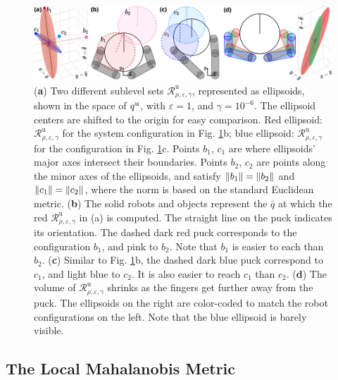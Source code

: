 \begin{figure}
\centering\includegraphics[width=1.0\textwidth]{figures/03_contact_rich_planning/reachability_planar_hand5.png}
\caption{(\textbf{a}) Two different sublevel sets $\mathcal{R}^\mathrm{u}_{\rho, \varepsilon, \gamma}$, represented as ellipsoids, shown in the space of ${q^\mathrm{u}}$, with $\varepsilon = 1$, and $\gamma = 10^{-6}$. The ellipsoid centers are shifted to the origin for easy comparison. Red ellipsoid: $\mathcal{R}^\mathrm{u}_{\rho, \varepsilon, \gamma}$ for the system configuration in Fig. \ref{fig:reachability_planar_hand}b; blue ellipsoid: $\mathcal{R}^\mathrm{u}_{\rho, \varepsilon, \gamma}$ for the configuration in Fig. \ref{fig:reachability_planar_hand}c. Points $b_1$, $c_1$ are where ellipsoids' major axes intersect their boundaries. Points $b_2$, $c_2$ are points along the minor axes of the ellipsoids, and satisfy $\left\lVert{b_1}\right\rVert = \left\lVert{b_2}\right\rVert$ and $\left\lVert{c_1}\right\rVert = \left\lVert{c_2}\right\rVert$, where the norm is based on the standard Euclidean metric.
(\textbf{b}) The solid robots and objects represent the $\bar{q}$ at which the red $\mathcal{R}^\mathrm{u}_{\rho, \varepsilon, \gamma}$ in (a) is computed. The straight line on the puck indicates its orientation. The dashed dark red puck corresponds to the configuration $b_1$, and pink to $b_2$. Note that $b_1$ is easier to each than $b_2$.
(\textbf{c}) Similar to Fig. \ref{fig:reachability_planar_hand}b, the dashed dark blue puck correspond to $c_1$, and light blue to $c_2$. It is also easier to reach $c_1$ than $c_2$.
(\textbf{d}) The volume of $\mathcal{R}^\mathrm{u}_{\rho, \varepsilon, \gamma}$ shrinks as the fingers get further away from the puck. The ellipsoids on the right are color-coded to match the robot configurations on the left. Note that the blue ellipsoid is barely visible.}
\label{fig:reachability_planar_hand}

\end{figure}

\subsection{The Local Mahalanobis Metric}

